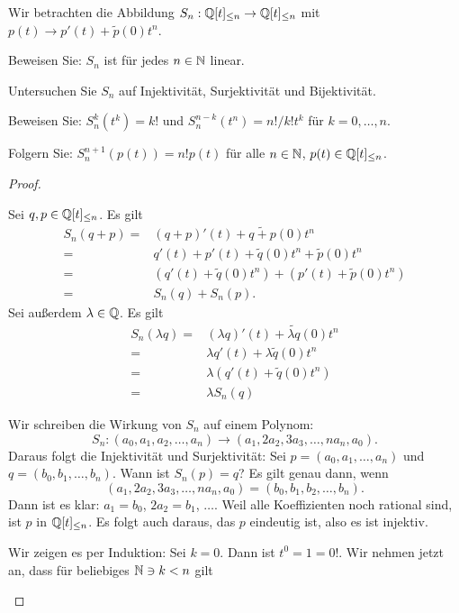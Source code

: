 \begin{Problem}
	Wir betrachten die Abbildung $S_n:\mathbb{Q}[t]_{\le n}\to \mathbb{Q}[t]_{\le n}$ mit $p(t)\to p'(t)+\tilde{p}(0)t^n$.
	\begin{parts}
	\item Beweisen Sie: $S_n$ ist f\"{u}r jedes $n\in \mathbb{N}$ linear.
	\item Untersuchen Sie $S_n$ auf Injektivität, Surjektivität und Bijektivität.
	\item Beweisen Sie: $S_n^k(t^k)=k!$ und $S_n^{n-k}(t^n)=n! / k!t^k$ f\"{u}r $k=0,\dots,n$.
	\item Folgern Sie: $S_n^{n+1}(p(t))=n!p(t)$ f\"{u}r alle $n\in \mathbb{N}$, $p(t)\in \mathbb{Q}[t]_{\le n}$.
	\end{parts}
\end{Problem}
\begin{proof}
	\begin{parts}
	\item Sei $q,p\in \mathbb{Q}[t]_{\le n}$. Es gilt
		\begin{align*}
			S_n(q+p)=&(q+p)'(t)+\widetilde{q+p}(0)t^n\\
			=&q'(t)+p'(t)+\tilde{q}(0)t^n+\tilde{p}(0)t^n\\
			=&(q'(t)+\tilde{q}(0)t^n)+(p'(t)+\tilde{p}(0)t^n)\\
			=&S_n(q)+S_n(p).
		\end{align*}
		Sei außerdem $\lambda\in \mathbb{Q}$. Es gilt
		\begin{align*}
			S_n(\lambda q)=&(\lambda q)'(t)+\widetilde{\lambda q}(0)t^n\\
			=&\lambda q'(t)+\lambda\tilde{q}(0)t^n\\
			=&\lambda\left( q'(t)+\tilde{q}(0)t^n \right) \\
			=&\lambda S_n(q)
		\end{align*}
	\item Wir schreiben die Wirkung von $S_n$ auf einem Polynom:
		\[
		S_n:(a_0,a_1,a_2,\dots, a_n)\to (a_1,2a_2,3a_3,\dots, na_n, a_0)
		.\] 
		Daraus folgt die Injektivität und Surjektivität: Sei $p=(a_0,a_1,\dots, a_n)$ und $q=(b_0,b_1,\dots, b_n)$. Wann ist $S_n(p)=q$? Es gilt genau dann, wenn
		\[
			(a_1,2a_2,3a_3,\dots, na_n, a_0)=(b_0,b_1,b_2,\dots, b_n)
		.\] 
		Dann ist es klar: $a_1=b_0$, $2a_2=b_1$, $\dots$. Weil alle Koeffizienten noch rational sind, ist $p$ in $\mathbb{Q}[t]_{\le n}$. Es folgt auch daraus, das $p$ eindeutig ist, also es ist injektiv.
	\item Wir zeigen es per Induktion: Sei $k=0$. Dann ist $t^0=1=0!$. Wir nehmen jetzt an, dass f\"{u}r beliebiges $\mathbb{N}\ni k < n$ gilt

\end{parts}
\end{proof}

